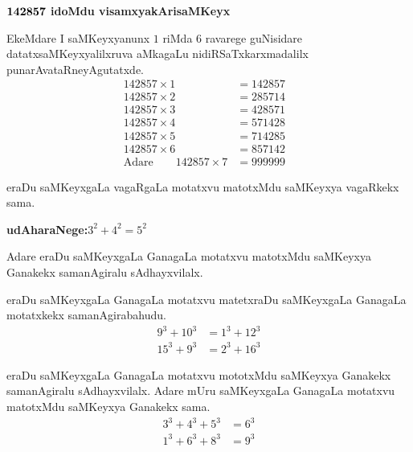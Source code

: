 \begin{flushleft}
{\bf $\bf 142857$ idoMdu visamxyakArisaMKeyx}
\end{flushleft}

EkeMdare I saMKeyxyanunx $1$ riMda $6$ ravarege guNisidare datatxsaMKeyxyalilxruva aMkagaLu nidiRSaTxkarxmadalilx punarAvataRneyAgutatxde.
\begin{align*}
142857 \times 1 &= 142857&\\
142857 \times 2 &= 285714&\\
142857 \times 3 &= 428571&\\
142857 \times 4 &= 571428&\\
142857 \times 5 &= 714285&\\
142857 \times 6 &= 857142&\\
\text{Adare}\qquad 142857 \times 7 &= 999999&
\end{align*}

\vfill\eject
eraDu saMKeyxgaLa vagaRgaLa motatxvu matotxMdu saMKeyxya vagaRkekx sama.

\textbf{udAharaNege:}\qquad $3^2+4^2 = 5^2$

Adare eraDu saMKeyxgaLa GanagaLa motatxvu matotxMdu saMKeyxya Ganakekx sama\-nAgiralu sAdhayxvilalx.

eraDu saMKeyxgaLa GanagaLa motatxvu matetxraDu saMKeyxgaLa GanagaLa motatxkekx sama\-nAgirabahudu.
\begin{align*}
9^3+10^3 &= 1^3+12^3\\
15^3+9^3 &= 2^3+ 16^3
\end{align*}

eraDu saMKeyxgaLa GanagaLa motatxvu mototxMdu saMKeyxya Ganakekx samanAgiralu sAdhayxvilalx. Adare mUru saMKeyxgaLa GanagaLa motatxvu matotxMdu saMKeyxya Ganakekx sama.
\begin{align*}
3^3+4^3+5^3 &=6^3\\
1^3+6^3+8^3 &= 9^3
\end{align*}

